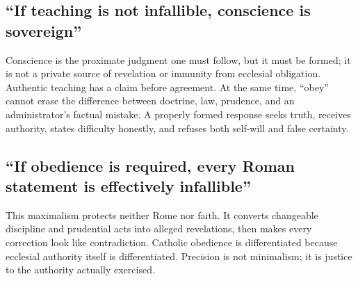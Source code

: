 \subsection{``If teaching is not infallible, conscience is sovereign''}

Conscience is the proximate judgment one must follow, but it must be formed; it
is not a private source of revelation or immunity from ecclesial obligation.
Authentic teaching has a claim before agreement. At the same time, ``obey''
cannot erase the difference between doctrine, law, prudence, and an
administrator's factual mistake. A properly formed response seeks truth,
receives authority, states difficulty honestly, and refuses both self-will and
false certainty.

\subsection{``If obedience is required, every Roman statement is effectively
infallible''}

This maximalism protects neither Rome nor faith. It converts changeable
discipline and prudential acts into alleged revelations, then makes every
correction look like contradiction. Catholic obedience is differentiated
because ecclesial authority itself is differentiated. Precision is not
minimalism; it is justice to the authority actually exercised.

